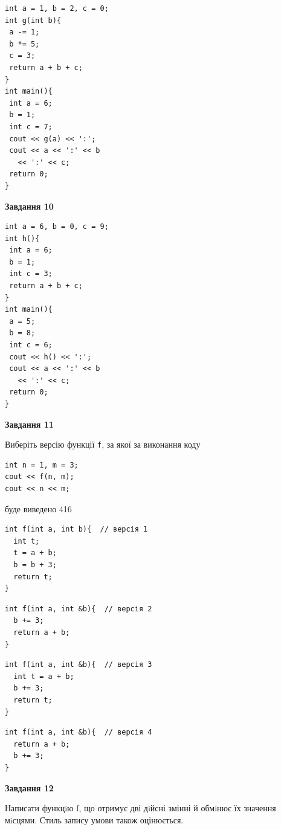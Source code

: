 \documentclass[12pt, ukrainian]{article}
\def\code#1{\Verb!#1!}
\begin{document}
{\begin {large}
\begin{minipage}[t]{7.0cm}
\begin{verbatim}
int a = 1, b = 2, c = 0;
int g(int b){
 a -= 1;
 b *= 5;
 c = 3;
 return a + b + c;
}
int main(){
 int a = 6;
 b = 1;
 int c = 7;
 cout << g(a) << ':';
 cout << a << ':' << b 
   << ':' << c;
 return 0;
}
\end{verbatim}



\begin{center}
\textbf{Завдання 10}
\end{center}
\vspace{-8mm}

\begin{verbatim}
int a = 6, b = 0, c = 9;
int h(){
 int a = 6;
 b = 1;
 int c = 3;
 return a + b + c;
}
int main(){
 a = 5;
 b = 8;
 int c = 6;
 cout << h() << ':';
 cout << a << ':' << b 
   << ':' << c;
 return 0;
}
\end{verbatim}

\end{minipage}
\vline \hspace{1mm}
\begin{minipage}[t]{11.0cm}

\begin{center}
\textbf{Завдання 11}
\end{center}
Виберіть версію функції \code{f}, за якої за виконання коду
\begin{verbatim}
int n = 1, m = 3;
cout << f(n, m);
cout << n << m;
\end{verbatim}

буде виведено 416

\begin{verbatim}
int f(int a, int b){  // версія 1
  int t;
  t = a + b;
  b = b + 3;
  return t;
}
\end{verbatim}

\vspace{-8mm}\begin{verbatim}
int f(int a, int &b){  // версія 2
  b += 3;
  return a + b;
}
\end{verbatim}

\vspace{-8mm}\begin{verbatim}
int f(int a, int &b){  // версія 3
  int t = a + b;
  b += 3;
  return t;
}
\end{verbatim}

\vspace{-8mm}\begin{verbatim}
int f(int a, int &b){  // версія 4
  return a + b;
  b += 3;
}
\end{verbatim}



\begin{center}
\textbf{Завдання 12}
\end{center}

Написати функцiю f, що отримує дві дiйсні змінні й обмiнює їх значення мiсцями. Стиль запису умови також оцінюється.\par

\end{minipage}

\end {large}}
\newpage
\end{document}
